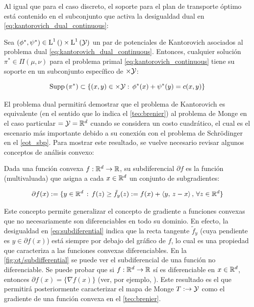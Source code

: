 Al igual que para el caso discreto, el soporte para el plan de transporte óptimo está contenido en el subconjunto que activa la desigualdad dual en \eqref{eq:kantorovich_dual_continuous}:

\begin{cor}
	\label{cor:supp_slackness}
	Sea $(\phi^*,\psi^*)\in \operatorname{L}^{1}\left(\right)\times\operatorname{L}^{1}\left(\mathcal{Y}\right)$ un par de potenciales de Kantorovich asociados al problema dual \eqref{eq:kantorovich_dual_continuous}. Entonces, cualquier solución $\pi^*\in\Pi(\mu,\nu)$ para el problema primal \eqref{eq:kantorovich_continuous} tiene su soporte en un subconjunto específico de $\times\mathcal{Y}$:

	\begin{equation*}
		\operatorname{Supp}\left(\pi^*\right)
		\subset \{(x,y)\in\times\mathcal{Y}:\, \phi^*(x) + \psi^*(y) = c(x,y)\}
	\end{equation*}
\end{cor}

El problema dual permitirá demostrar que el problema de Kantorovich es equivalente (en el sentido que lo indica el \autoref{teo:brenier}) al problema de Monge en el caso particular $=\mathcal{Y}=\mathbb{R}^d$ cuando se considera un costo cuadrático, el cual es el escenario más importante debido a su conexión con el problema de Schrödinger en el \autoref{eot_sbp}. Para mostrar este resultado, se vuelve necesario revisar algunos conceptos de análisis convexo:

\begin{defn}[subdiferencial]
	Dada una función convexa $f:\mathbb{R}^d\to\mathbb{R}$, su subdiferencial $\partial f$ es la función (multivaluada) que asigna a cada $x\in\mathbb{R}^d$ un conjunto de subgradientes:

	\begin{equation}
		\label{eq:subdiferential}
		\partial f(x) := \{y\in\mathbb{R}^d\,:\,f(z)\geq \tilde{f}_y(z) := f(x) + \left\langle y,\,z-x\right\rangle,\,\forall z\in\mathbb{R}^d\}
	\end{equation}

\end{defn}

Este concepto permite generalizar el concepto de gradiente a funciones convexas que no necesariamente son diferenciables en todo su dominio. En efecto, la desigualdad en \eqref{eq:subdiferential} indica que la recta tangente $\tilde{f}_y$ (cuya pendiente es $y\in\partial f(x)$) está siempre por debajo del gráfico de $f$, lo cual es una propiedad que caracteriza a las funciones convexas diferenciables. En la \autoref{fig:ot/subdifferential} se puede ver el subdiferencial de una función no diferenciable. Se puede probar que si $f:\mathbb{R}^d\to\mathbb{R}$ sí es diferenciable en $x\in\mathbb{R}^d$, entonces $\partial f(x)=\{\nabla f(x)\}$ (ver, por ejemplo, \cite{villani2003topics}). Este resultado es el que permitirá posteriormente caracterizar el mapa de Monge $T:\to\mathcal{Y}$ como el gradiente de una función convexa en el \autoref{teo:brenier}.

